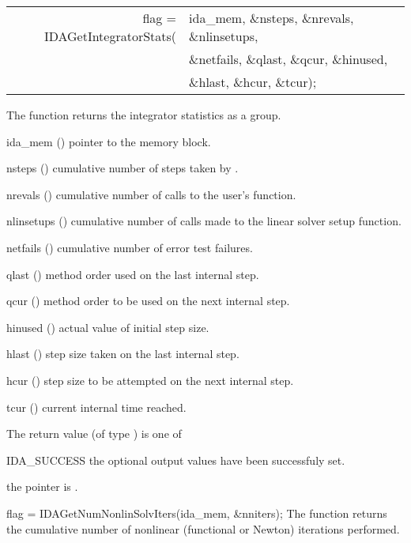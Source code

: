 {
  \begin{tabular}[t]{@{}r@{}l@{}}
    flag = IDAGetIntegratorStats(&ida\_mem, \&nsteps, \&nrevals, \&nlinsetups, \\
                                 &\&netfails, \&qlast, \&qcur, \&hinused,\\
                                 &\&hlast, \&hcur, \&tcur);
  \end{tabular}
}
{
  The function  returns the {\ida} integrator statistics
  as a group.
}
{
  \begin{args}[nlinsetups]
  \item[ida\_mem] ()
    pointer to the {\ida} memory block.
  \item[nsteps] ()
    cumulative number of steps taken by {\ida}.
  \item[nrevals] ()
    cumulative number of calls to the user's  function.
  \item[nlinsetups] ()
    cumulative number of calls made to the linear solver setup function.
  \item[netfails] ()
    cumulative number of error test failures.
  \item[qlast] ()
    method order used on the last internal step.
  \item[qcur] ()
    method order to be used on the next internal step.
  \item[hinused] ()
    actual value of initial step size.
  \item[hlast] ()
    step size taken on the last internal step.
  \item[hcur] ()
    step size to be attempted on the next internal step.
  \item[tcur] ()
    current internal time reached.
  \end{args}
}
{
  The return value  (of type ) is one of
  \begin{args}
  \item[IDA\_SUCCESS] 
    the optional output values have been successfuly set.
  \item[\Id{IDA\_MEM\_NULL}]
    the  pointer is .
  \end{args}
}
{}
{
  flag = IDAGetNumNonlinSolvIters(ida\_mem, \&nniters);
}
{
  The function  returns the
  cumulative number of nonlinear (functional or Newton) iterations performed. 
}
